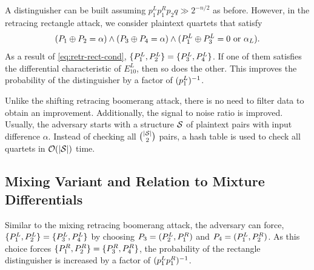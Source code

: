 \documentclass[notheorems]{beamer}
\theoremstyle{definition}
\theoremstyle{example}
\begin{document}
A distinguisher can be built assuming \(p_1^Lp_1^Rp_2q \gg 2^{-n/2}\) as before.
However, in the retracing rectangle attack, we consider plaintext quartets that
satisfy
\begin{equation}
    (P_1 \oplus P_2 = \alpha) \land (P_3 \oplus P_4 = \alpha) \land (P_1^L \oplus P_3^L = 0 \textrm{ or } \alpha_L).
    \label{eq:retr-rect-cond}
\end{equation}
As a result of \eqref{eq:retr-rect-cond}, \(\{P_1^L, P_2^L\} = \{P_3^L,
P_4^L\}\). If one of them satisfies the differential characteristic of
\(E_{10}^L\), then so does the other. This improves the probability of the
distinguisher by a factor of \((p_1^L)^{-1}\).

Unlike the shifting retracing boomerang attack, there is no need to filter data
to obtain an improvement. Additionally, the signal to noise ratio is improved.
Usually, the adversary starts with a structure \(\mathcal S\) of plaintext pairs with
input difference \(\alpha\). Instead of checking all \(\binom{\left\vert\mathcal S\right\vert}{2}\)
pairs, a hash table is used to check all quartets in \(\mathcal O(\left\vert\mathcal S\right\vert)\)
time.

\subsection{Mixing Variant and Relation to Mixture Differentials}

Similar to the mixing retracing boomerang attack, the adversary can force,
\(\{P_1^L, P_2^L\} = \{P_3^L, P_4^L\}\) by choosing \(P_3 = (P_2^L,
P_1^R)\) and \(P_4 = (P_1^L, P_2^R)\). As this choice forces
\(\{P_1^R, P_2^R\} = \{P_3^R, P_4^R\}\), the probability of the
rectangle distinguisher is increased by a factor of \((p_1^Lp_1^R)^{-1}\).
\end{document}
